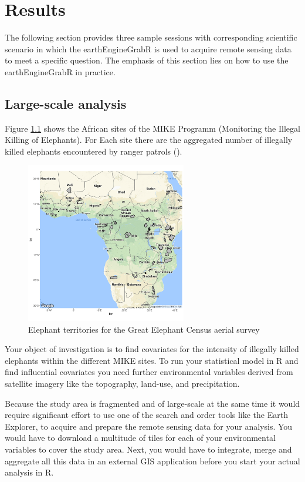 \chapter{Results}

The following section provides three sample sessions with corresponding scientific scenario in which the earthEngineGrabR is used to acquire remote sensing data to meet a specific question. The emphasis of this section lies on how to use the earthEngineGrabR in practice.

\section{Large-scale analysis}

Figure \ref{territories} shows the African sites of the MIKE Programm (Monitoring the Illegal Killing of Elephants). 
For Each site there are the aggregated number of illegally killed elephants encountered by ranger patrols (\cite{burn2011global}).


\begin{figure}
	\begin{center}
		\includegraphics[width=7cm]{images/territories.pdf}
	\end{center}
	\caption{Elephant territories for the Great Elephant Census aerial survey}
	\label{territories}
\end{figure}


Your object of investigation is to find covariates for the intensity of illegally killed elephants within the different MIKE sites.
To run your statistical model in R and find influential covariates you need further environmental variables derived from satellite imagery like the topography, land-use, and precipitation. 

Because the study area is fragmented and of large-scale at the same time it would require significant effort to use one of the search and order tools like the Earth Explorer, to acquire and prepare the remote sensing data for your analysis. You would have to download a multitude of tiles for each of your environmental variables to cover the study area. Next, you would have to integrate, merge and aggregate all this data in an external GIS application before you start your actual analysis in R.


